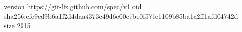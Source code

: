 version https://git-lfs.github.com/spec/v1
oid sha256:cfe9cd9b6a1f2d4daa4373c49d6e00e7be0f571e1109b85ba1a2ff1afd04742d
size 2015
